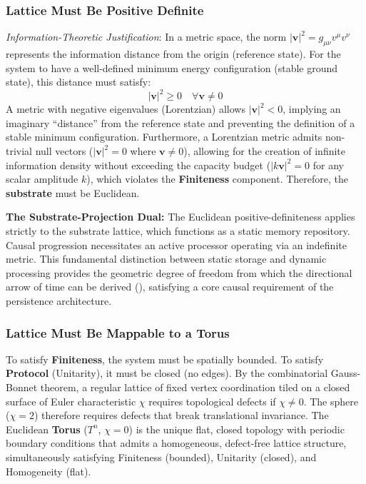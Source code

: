\subsubsection{Lattice Must Be Positive Definite}
\label{subsec:positive_definite}
\textit{Information-Theoretic Justification}: In a metric space, the norm $|\mathbf{v}|^2 = g_{\mu\nu}v^\mu v^\nu$ represents the information distance from the origin (reference state). For the system to have a well-defined minimum energy configuration (stable ground state), this distance must satisfy:
\begin{equation}
    |\mathbf{v}|^2 \geq 0 \quad \forall \mathbf{v} \neq 0
\end{equation}
A metric with negative eigenvalues (Lorentzian) allows $|\mathbf{v}|^2 < 0$, implying an imaginary ``distance'' from the reference state and preventing the definition of a stable minimum configuration. Furthermore, a Lorentzian metric admits non-trivial null vectors ($|\mathbf{v}|^2 = 0$ where $\mathbf{v} \neq 0$), allowing for the creation of infinite information density without exceeding the capacity budget ($|k\mathbf{v}|^2 = 0$ for any scalar amplitude $k$), which violates the \textbf{Finiteness} component. Therefore, the \textbf{substrate} must be Euclidean.

\textbf{The Substrate-Projection Dual:}
The Euclidean positive-definiteness applies strictly to the substrate lattice, which functions as a static memory repository. Causal progression necessitates an active processor operating via an indefinite metric. This fundamental distinction between static storage and dynamic processing provides the geometric degree of freedom from which the directional arrow of time can be derived (), satisfying a core causal requirement of the persistence architecture.

\subsubsection{Lattice Must Be Mappable to a Torus}
\label{sec:torus}

To satisfy \textbf{Finiteness}, the system must be spatially bounded. To satisfy \textbf{Protocol} (Unitarity), it must be closed (no edges). By the combinatorial Gauss-Bonnet theorem, a regular lattice of fixed vertex coordination tiled on a closed surface of Euler characteristic $\chi$ requires topological defects if $\chi \neq 0$. The sphere ($\chi = 2$) therefore requires defects that break translational invariance. The Euclidean \textbf{Torus} ($T^n$, $\chi=0$) is the unique flat, closed topology with periodic boundary conditions that admits a homogeneous, defect-free lattice structure, simultaneously satisfying Finiteness (bounded), Unitarity (closed), and Homogeneity (flat).

